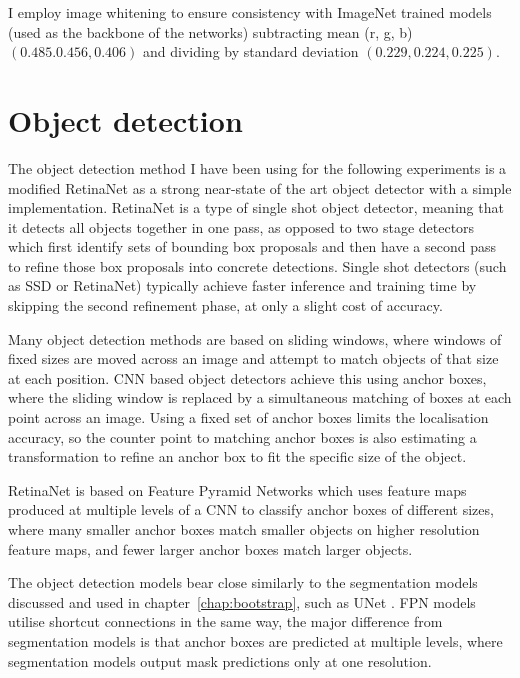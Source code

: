 I employ image whitening to ensure consistency with ImageNet trained models (used as the backbone of the networks) subtracting mean (r, g, b) $ (0.485. 0.456, 0.406) $ and dividing by standard deviation $ (0.229, 0.224, 0.225) $.


\section {Object detection}

The object detection method I have been using for the following experiments is a modified RetinaNet \cite{Lin2017} as a strong near-state of the art object detector with a simple implementation. RetinaNet is a type of single shot object detector, meaning that it detects all objects together in one pass, as opposed to two stage detectors which first identify sets of bounding box proposals and then have a second pass to refine those box proposals into concrete detections. Single shot detectors (such as \gls{SSD} \cite{Liu2016a} or RetinaNet) typically achieve faster inference and training time by skipping the second refinement phase, at only a slight cost of accuracy.  

Many object detection methods are based on sliding windows, where windows of fixed sizes are moved across an image and attempt to match objects of that size at each position. \gls{CNN} based object detectors achieve this using anchor boxes, where the sliding window is replaced by a simultaneous matching of boxes at each point across an image. Using a fixed set of anchor boxes limits the localisation accuracy, so the counter point to matching anchor boxes is also estimating a transformation to refine an anchor box to fit the specific size of the object.

RetinaNet is based on Feature Pyramid Networks \cite{Lin2017a} which uses feature maps produced at multiple levels of a \gls{CNN} to classify anchor boxes of different sizes, where many smaller anchor boxes match smaller objects on higher resolution feature maps, and fewer larger anchor boxes match larger objects. 

The object detection models bear close similarly to the segmentation models discussed and used in chapter~\ref{chap:bootstrap}, such as UNet \cite{Ronneberger2015}. \gls{FPN} models utilise shortcut connections in the same way, the major difference from segmentation models is that anchor boxes are predicted at multiple levels, where segmentation models output mask predictions only at one resolution.


